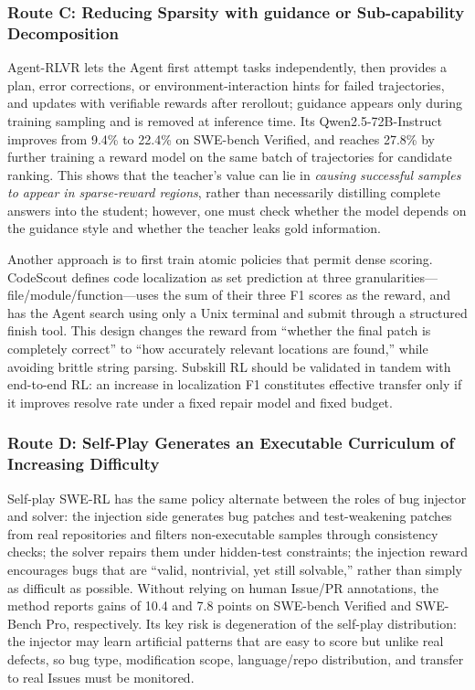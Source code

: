 \documentclass[10pt,a4paper,UTF8,fontset=none]{ctexart}
\begin{document}
\subsubsection{Route C: Reducing Sparsity with guidance or Sub-capability Decomposition}

Agent-RLVR lets the Agent first attempt tasks independently, then provides a plan, error corrections, or environment-interaction hints for failed trajectories, and updates with verifiable rewards after rerollout; guidance appears only during training sampling and is removed at inference time\cite{da2025agentrlvr}. Its Qwen2.5-72B-Instruct improves from 9.4\% to 22.4\% on SWE-bench Verified, and reaches 27.8\% by further training a reward model on the same batch of trajectories for candidate ranking. This shows that the teacher's value can lie in \emph{causing successful samples to appear in sparse-reward regions}, rather than necessarily distilling complete answers into the student; however, one must check whether the model depends on the guidance style and whether the teacher leaks gold information.

Another approach is to first train atomic policies that permit dense scoring. CodeScout defines code localization as set prediction at three granularities---file/module/function---uses the sum of their three F1 scores as the reward, and has the Agent search using only a Unix terminal and submit through a structured finish tool\cite{sutawika2026codescout}. This design changes the reward from ``whether the final patch is completely correct'' to ``how accurately relevant locations are found,'' while avoiding brittle string parsing. Subskill RL should be validated in tandem with end-to-end RL: an increase in localization F1 constitutes effective transfer only if it improves resolve rate under a fixed repair model and fixed budget.

\subsubsection{Route D: Self-Play Generates an Executable Curriculum of Increasing Difficulty}

Self-play SWE-RL has the same policy alternate between the roles of bug injector and solver: the injection side generates bug patches and test-weakening patches from real repositories and filters non-executable samples through consistency checks; the solver repairs them under hidden-test constraints; the injection reward encourages bugs that are ``valid, nontrivial, yet still solvable,'' rather than simply as difficult as possible\cite{wei2025selfplay}. Without relying on human Issue/PR annotations, the method reports gains of 10.4 and 7.8 points on SWE-bench Verified and SWE-Bench Pro, respectively. Its key risk is degeneration of the self-play distribution: the injector may learn artificial patterns that are easy to score but unlike real defects, so bug type, modification scope, language/repo distribution, and transfer to real Issues must be monitored.
\end{document}
